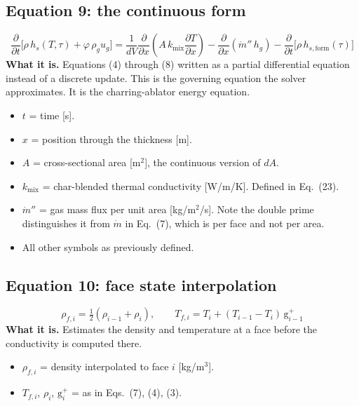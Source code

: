 \documentclass[11pt]{article}
\begin{document}
\subsection*{Equation 9: the continuous form}
\begin{equation}
\frac{\partial}{\partial t}\Big[\rho\,h_s(T,\tau) + \varphi\,\rho_g u_g\Big]
= \frac{1}{dV}\frac{\partial}{\partial x}\!\left(A\,k_{\mathrm{mix}}\frac{\partial T}{\partial x}\right)
- \frac{\partial}{\partial x}\!\left(\dot m''\, h_g\right)
- \frac{\partial}{\partial t}\Big[\rho\,h_{s,\mathrm{form}}(\tau)\Big]
\end{equation}
\textbf{What it is.} Equations (4) through (8) written as a partial differential
equation instead of a discrete update. This is the governing equation the solver
approximates. It is the charring-ablator energy equation.
\begin{itemize}
  \item $t$ = time [s].
  \item $x$ = position through the thickness [m].
  \item $A$ = cross-sectional area [m$^2$], the continuous version of $dA$.
  \item $k_{\mathrm{mix}}$ = char-blended thermal conductivity [W/m/K]. Defined
        in Eq.~(23).
  \item $\dot m''$ = gas mass flux per unit area [kg/m$^2$/s]. Note the double
        prime distinguishes it from $\dot m$ in Eq.~(7), which is per face and
        not per area.
  \item All other symbols as previously defined.
\end{itemize}

\subsection*{Equation 10: face state interpolation}
\begin{equation}
\rho_{f,i} = \tfrac12\left(\rho_{i-1} + \rho_i\right), \qquad
T_{f,i} = T_i + (T_{i-1} - T_i)\,\mathrm{g}^+_{i-1}
\end{equation}
\textbf{What it is.} Estimates the density and temperature at a face before the
conductivity is computed there.
\begin{itemize}
  \item $\rho_{f,i}$ = density interpolated to face $i$ [kg/m$^3$].
  \item $T_{f,i}$, $\rho_i$, $\mathrm{g}^+_i$ = as in Eqs.~(7), (4), (3).
\end{itemize}
\end{document}
